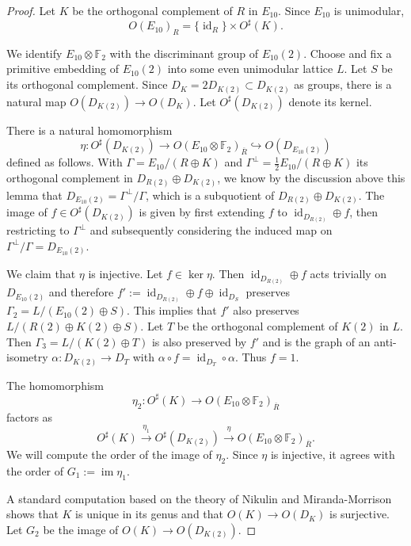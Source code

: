 \documentclass[a4paper]{amsart}
\theoremstyle{definition}
\theoremstyle{plain}
\DeclareMathOperator{\id}{id}
\DeclareMathOperator{\im}{im}
\newcommand{\FF}{\mathbb{F}}
\begin{document}
\begin{proof}
Let $K$ be the orthogonal complement of $R$ in $E_{10}$.
Since $E_{10}$ is unimodular, 
\[O(E_{10})_R = \{\id_{R}\} \times O^\sharp(K).\]

We identify $E_{10}\otimes \FF_2$ with the discriminant group of $E_{10}(2)$.
Choose and fix a primitive embedding of $E_{10}(2)$ into some even unimodular lattice $L$. Let $S$ be its orthogonal complement. Since $D_{K}=2D_{K(2)}\subset D_{K(2)}$ as groups, there is a natural map $O(D_{K(2)}) \to O(D_K)$.
Let $O^\sharp(D_{K(2)})$ denote its kernel.

There is a natural homomorphism 
\[\eta \colon O^\sharp(D_{K(2)}) \to O(E_{10}\otimes \FF_2)_{\overline{R}} \hookrightarrow O(D_{E_{10}(2)})\] 
defined as follows.
With $\Gamma = E_{10}/(R\oplus K)$ and $\Gamma^\perp = \tfrac{1}{2}E_{10}/(R\oplus K)$ its orthogonal complement in $D_{R(2)}\oplus D_{K(2)}$, we know by the discussion above this lemma that
$D_{E_{10}(2)}=\Gamma^\perp/ \Gamma$, which is a subquotient of $D_{R(2)}\oplus D_{K(2)}$. 
The image of $f \in O^\sharp(D_{K(2)})$ is given by first extending $f$ to $\id_{D_{R(2)}}\oplus f$, then restricting to $\Gamma^\perp$ and subsequently considering the induced map on $\Gamma^\perp/\Gamma =D_{E_{10}(2)}$.

We claim that $\eta$ is injective. Let $f \in \ker \eta$. Then $\id_{D_{R(2)}}\oplus f$ acts trivially on $D_{E_{10}(2)}$ and therefore
$f':=\id_{D_{R(2)}}\oplus f \oplus \id_{D_S}$ preserves $\Gamma_2 = L/(E_{10}(2)\oplus S)$. This implies that $f'$ also preserves $L/(R(2) \oplus K(2) \oplus S)$. Let $T$ be the orthogonal complement of $K(2)$ in $L$. Then $\Gamma_3 = L / (K(2) \oplus T)$ is also preserved by $f'$ and is the graph of an anti-isometry $\alpha \colon D_{K(2)}\to D_T$ with 
$\alpha \circ f = \id_{D_{T}} \circ \alpha$. Thus $f = 1$.

The homomorphism 
\[\eta_2\colon O^\sharp(K) \to O(E_{10}\otimes \FF_2)_{\overline{R}}\] 
factors as  
\[O^\sharp(K) \xrightarrow{\eta_1} O^\sharp(D_{K(2)})\xrightarrow{\eta} O(E_{10}\otimes \FF_2)_{\overline{R}}.\] 
We will compute the order of the image of $\eta_2$. Since $\eta$ is injective, it agrees with the order of $G_1:=\im \eta_1$.

A standard computation based on the theory of Nikulin \cite{nikulin} and Miranda-Morrison \cite[VIII Theorem 7.5]{miranda_morrison:embeddings} shows that $K$ is unique in its genus and that $O(K) \to O(D_K)$ is surjective. 
Let $G_2$ be the image of $O(K) \to O(D_{K(2)})$.


\end{proof}
\end{document}
